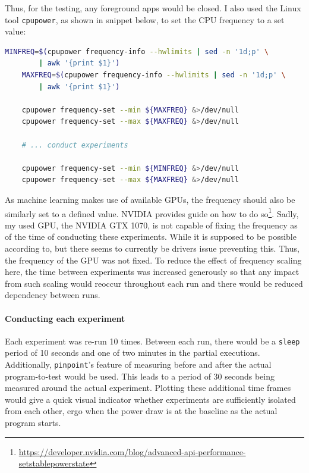 Thus, for the testing, any foreground apps would be closed. I also used the Linux tool \verb|cpupower|, as shown in snippet below, to set the CPU frequency to a set value:

\begin{lstlisting}[language=bash, frame=single, numbers=none, caption={Used operating system information}, basicstyle=\ttfamily]
    MINFREQ=$(cpupower frequency-info --hwlimits | sed -n '1d;p' \
        | awk '{print $1}')
    MAXFREQ=$(cpupower frequency-info --hwlimits | sed -n '1d;p' \
        | awk '{print $1}')
    
    cpupower frequency-set --min ${MAXFREQ} &>/dev/null
    cpupower frequency-set --max ${MAXFREQ} &>/dev/null

    # ... conduct experiments

    cpupower frequency-set --min ${MINFREQ} &>/dev/null
    cpupower frequency-set --max ${MAXFREQ} &>/dev/null
\end{lstlisting}
\label{listing:setting_cpu_frequency}

As machine learning makes use of available GPUs, the frequency should also be similarly set to a defined value. 
NVIDIA provides guide on how to do so\footnote{\url{https://developer.nvidia.com/blog/advanced-api-performance-setstablepowerstate}}.
Sadly, my used GPU, the NVIDIA GTX 1070, is not capable of fixing the frequency as of the time of conducting these experiments. 
While it is supposed to be possible according to, but there seems to currently be drivers issue preventing this. 
Thus, the frequency of the GPU was not fixed. 
To reduce the effect of frequency scaling here, the time between experiments was increased generously so that any impact from such scaling would reoccur throughout each run and there would be reduced dependency between runs.

\todo{Further explain how the experiments were conducted}

\paragraph{Conducting each experiment}

Each experiment was re-run 10 times. Between each run, there would be a \verb|sleep| period of 10 seconds and one of two minutes in the partial executions. 
Additionally, \verb|pinpoint|'s feature of measuring before and after the actual program-to-test would be used. 
This leads to a period of 30 seconds being measured around the actual experiment. 
Plotting these additional time frames would give a quick visual indicator whether experiments are sufficiently isolated from each other, ergo when the power draw is at the baseline as the actual program starts.

